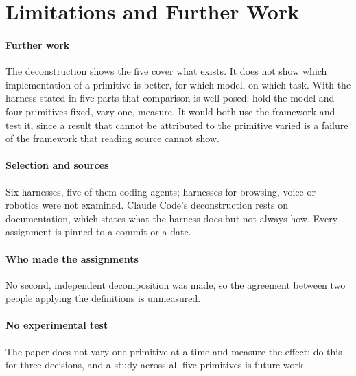 \section{Limitations and Further Work}
\label{sec:limitations}
\paragraph{Further work} The deconstruction shows the five cover what exists. It does not show which implementation of a primitive is better, for which model, on which task. With the harness stated in five parts that comparison is well-posed: hold the model and four primitives fixed, vary one, measure. It would both use the framework and test it, since a result that cannot be attributed to the primitive varied is a failure of the framework that reading source cannot show.

\paragraph{Selection and sources} Six harnesses, five of them coding agents; harnesses for browsing, voice or robotics were not examined. Claude Code's deconstruction rests on documentation, which states what the harness does but not always how. Every assignment is pinned to a commit or a date.

\paragraph{Who made the assignments} No second, independent decomposition was made, so the agreement between two people applying the definitions is unmeasured.

\paragraph{No experimental test} The paper does not vary one primitive at a time and measure the effect; \cite{fan2026empirical} do this for three decisions, and a study across all five primitives is future work.
